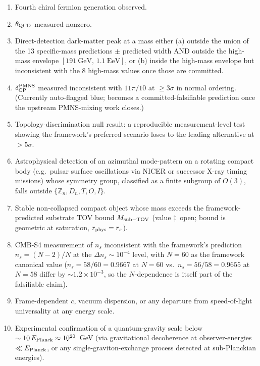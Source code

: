 \documentclass[reprint,amsmath,amssymb,aps,prd,longbibliography,floatfix]{revtex4-2}
\begin{document}
\begin{enumerate}\itemsep0pt
\item[$\dagger$] Fourth chiral fermion generation observed.
\item[$\dagger$] $\theta_{\rm QCD}$ measured nonzero.
\item[$\ddagger$] Direct-detection dark-matter peak at a mass
either (a) outside the union of the 13 specific-mass predictions
$\pm$ predicted width AND outside the high-mass envelope
$[191~\mathrm{GeV},\,1.1~\mathrm{EeV}]$, or (b) inside the high-mass
envelope but inconsistent with the 8 high-mass values once those
are committed.
\item[$\ddagger$] $\delta_{\rm CP}^{\rm PMNS}$ measured inconsistent
with $11\pi/10$ at $\geq 3\sigma$ in normal ordering. (Currently
auto-flagged blue; becomes a committed-falsifiable prediction once
the upstream PMNS-mixing work closes.)
\item[$\dagger$] Topology-discrimination null result: a reproducible
measurement-level test showing the framework's preferred scenario
loses to the leading alternative at $> 5\sigma$.
\item[$\dagger$] Astrophysical detection of an azimuthal mode-pattern
on a rotating compact body (e.g.\ pulsar surface oscillations via
NICER or successor X-ray timing missions) whose symmetry group,
classified as a finite subgroup of $O(3)$, falls outside
$\{\mathbb{Z}_n, D_n, T, O, I\}$.
\item[$\ddagger$] Stable non-collapsed compact object whose mass
exceeds the framework-predicted substrate TOV bound $M_{\rm sub-TOV}$
(value $\ddagger$~open; bound is geometric at saturation,
$r_{\rm phys} = r_s$).
\item[$\dagger$] CMB-S4 measurement of $n_s$ inconsistent with the
framework's prediction $n_s = (N-2)/N$ at the $\Delta n_s\sim 10^{-4}$
level, with $N=60$ as the framework canonical value
($n_s = 58/60 = 0.9667$ at $N=60$ vs.\ $n_s = 56/58 = 0.9655$ at
$N=58$ differ by $\sim 1.2\times 10^{-3}$, so the $N$-dependence
is itself part of the falsifiable claim).
\item[$\dagger$] Frame-dependent $c$, vacuum dispersion, or any
departure from speed-of-light universality at any energy scale.
\item[$\dagger$] Experimental confirmation of a quantum-gravity
scale below $\sim 10\,E_{\rm Planck} \approx 10^{20}$~GeV (via
gravitational decoherence at observer-energies $\ll E_{\rm Planck}$,
or any single-graviton-exchange process detected at sub-Planckian
energies).
\end{enumerate}
\end{document}
